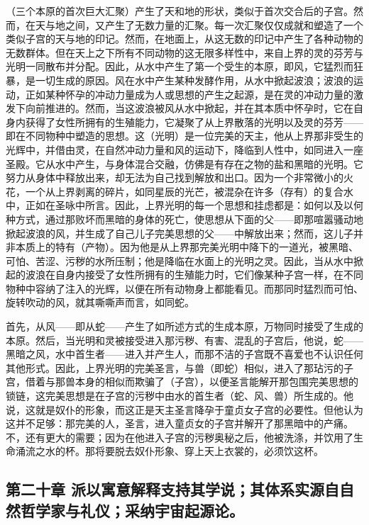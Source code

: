 （三个本原的首次巨大汇聚）产生了天和地的形状，类似于首次交合后的子宫。然而，在天与地之间，又产生了无数力量的汇聚。每一次汇聚仅仅成就和塑造了一个类似子宫的天与地的印记。然而，在地面上，从这无数的印记中产生了各种动物的无数群体。但在天上之下所有不同动物的这无限多样性中，来自上界的灵的芬芳与光明一同散布并分配。因此，从水中产生了第一个受生的本原，即风，它猛烈而狂暴，是一切生成的原因。风在水中产生某种发酵作用，从水中掀起波浪；波浪的运动，正如某种怀孕的冲动力量成为人或思想的产生之起源，是在灵的冲动力量的激发下向前推进的。然而，当这波浪被风从水中掀起，并在其本质中怀孕时，它在自身内获得了女性所拥有的生殖能力，它凝聚了从上界散落的光明以及灵的芬芳——即在不同物种中塑造的思想。这（光明）是一位完美的天主，他从上界那非受生的光辉中，并借由灵，在自然冲动力量和风的运动下，降临到人性中，如同进入一座圣殿。它从水中产生，与身体混合交融，仿佛是有存在之物的盐和黑暗的光明。它努力从身体中释放出来，却无法为自己找到解放和出口。因为一个非常微小的火花，一个从上界剥离的碎片，如同星辰的光芒，被混杂在许多（存有）的复合水中，正如在圣咏中所言。因此，上界光明的每一个思想和挂虑都是：如何以及以何种方式，通过那败坏而黑暗的身体的死亡，使思想从下面的父——即那喧嚣骚动地掀起波浪的风，并生成了自己儿子完美思想的父——中解放出来；然而，这儿子并非本质上的特有（产物）。因为他是从上界那完美光明中降下的一道光，被黑暗、可怕、苦涩、污秽的水所压制；他是降临在水面上的光明之灵。因此，当从水中掀起的波浪在自身内接受了女性所拥有的生殖能力时，它们像某种子宫一样，在不同物种中容纳了注入的光辉，以便在所有动物身上都能看见。而那同时猛烈而可怕、旋转吹动的风，就其嘶嘶声而言，如同蛇。\par

首先，从风——即从蛇——产生了如所述方式的生成本原，万物同时接受了生成的本原。然后，当光明和灵被接受进入那污秽、有害、混乱的子宫后，他说，蛇——黑暗之风，水中首生者——进入并产生人，而那不洁的子宫既不喜爱也不认识任何其他形式。因此，上界光明的完美圣言，与兽（即蛇）相似，进入了那玷污的子宫，借着与那兽本身的相似而欺骗了（子宫），以便圣言能解开那包围完美思想的锁链，这完美思想是在子宫的污秽中由水的首生者（蛇、风、兽）所生成的。他说，这就是奴仆的形象，而这正是天主圣言降孕于童贞女子宫的必要性。但他认为这并不足够：那完美的人，圣言，进入童贞女的子宫并解开了那黑暗中的产痛。不，还有更大的需要；因为在他进入子宫的污秽奥秘之后，他被洗涤，并饮用了生命涌流之水的杯。那将要脱去奴仆形象、穿上天上衣裳的，必须饮这杯。\par


\subsection{第二十章 派以寓意解释支持其学说；其体系实源自自然哲学家与礼仪；采纳宇宙起源论。}

